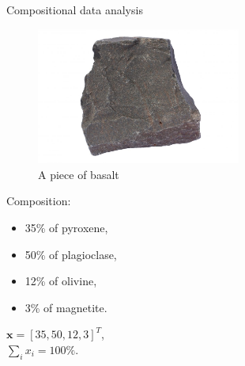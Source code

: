 \documentclass{beamer}
\begin{document}
\begin{frame}{Compositional data analysis}
  \begin{minipage}{0.49\textwidth}
    \begin{figure}
      \centering
      \includegraphics[width=0.6\textwidth]{figures/basalt.jpg}
      \caption{A piece of basalt}
    \end{figure}
  \end{minipage}
    \begin{minipage}{0.5\textwidth}
      Composition:
      \begin{itemize}
      \item 35\% of pyroxene,
      \item 50\% of plagioclase,
      \item 12\% of olivine,
      \item 3\% of magnetite.  
      \end{itemize}
      \vspace{0.4cm}
      $\bm{x} = [35,50,12,3]^T$,\\
      \vspace{0.2cm}
      $\displaystyle \sum_{i} x_i = 100\%$.
  \end{minipage}
\end{frame}
\end{document}
